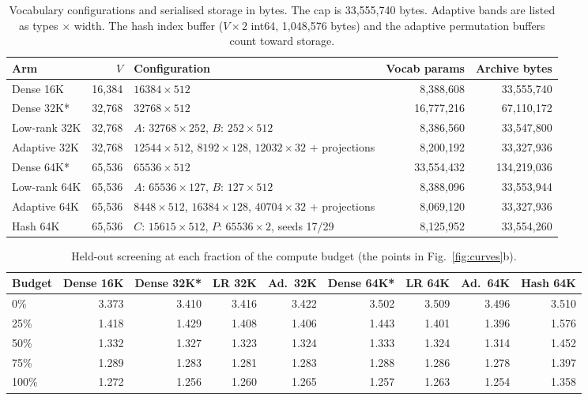 \documentclass[10pt,a4paper]{article}
\newcommand{\bpb}{\text{BPB}}
\begin{document}
\begin{table}[h]
\centering
\caption{Vocabulary configurations and serialised storage in bytes. The cap is 33,555,740 bytes. Adaptive
bands are listed as types $\times$ width. The hash index buffer ($V\times2$ int64, 1,048,576 bytes) and the
adaptive permutation buffers count toward storage.}
\label{tab:config}
\begin{tabular}{@{}lrlrr@{}}
\toprule
Arm & $V$ & Configuration & Vocab params & Archive bytes\\
\midrule
Dense 16K & 16,384 & $16384\times512$ & 8,388,608 & 33,555,740\\
Dense 32K* & 32,768 & $32768\times512$ & 16,777,216 & 67,110,172\\
Low-rank 32K & 32,768 & $A{:}\,32768\times252$, $B{:}\,252\times512$ & 8,386,560 & 33,547,800\\
Adaptive 32K & 32,768 & $12544{\times}512$, $8192{\times}128$, $12032{\times}32$ + projections & 8,200,192 & 33,327,936\\
Dense 64K* & 65,536 & $65536\times512$ & 33,554,432 & 134,219,036\\
Low-rank 64K & 65,536 & $A{:}\,65536\times127$, $B{:}\,127\times512$ & 8,388,096 & 33,553,944\\
Adaptive 64K & 65,536 & $8448{\times}512$, $16384{\times}128$, $40704{\times}32$ + projections & 8,069,120 & 33,327,936\\
Hash 64K & 65,536 & $C{:}\,15615\times512$, $P{:}\,65536\times2$, seeds 17/29 & 8,125,952 & 33,554,260\\
\bottomrule
\end{tabular}
\end{table}

\begin{table}[h]
\centering
\caption{Held-out screening \bpb{} at each fraction of the compute budget (the points in
Fig.~\ref{fig:curves}b).}
\label{tab:budget}
\begin{tabular}{@{}lrrrrrrrr@{}}
\toprule
Budget & Dense 16K & Dense 32K* & LR 32K & Ad.\ 32K & Dense 64K* & LR 64K & Ad.\ 64K & Hash 64K\\
\midrule
0\%   & 3.373 & 3.410 & 3.416 & 3.422 & 3.502 & 3.509 & 3.496 & 3.510\\
25\%  & 1.418 & 1.429 & 1.408 & 1.406 & 1.443 & 1.401 & 1.396 & 1.576\\
50\%  & 1.332 & 1.327 & 1.323 & 1.324 & 1.333 & 1.324 & 1.314 & 1.452\\
75\%  & 1.289 & 1.283 & 1.281 & 1.283 & 1.288 & 1.286 & 1.278 & 1.397\\
100\% & 1.272 & 1.256 & 1.260 & 1.265 & 1.257 & 1.263 & 1.254 & 1.358\\
\bottomrule
\end{tabular}
\end{table}
\end{document}
